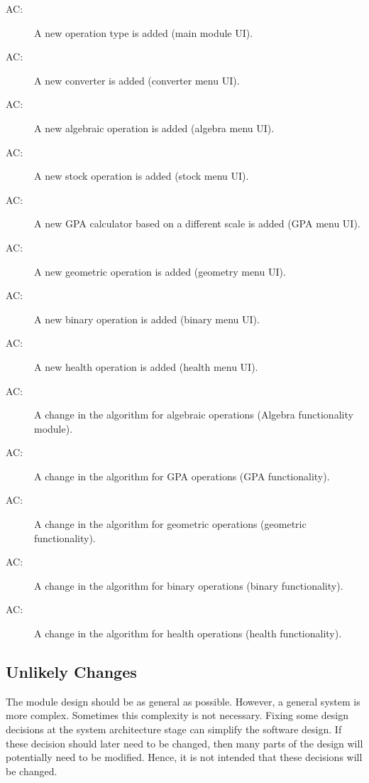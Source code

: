 \documentclass[12pt, titlepage]{article}
\newcounter{acnum}
\newcommand{\actheacnum}{AC\theacnum}
\begin{document}
\begin{description}
\item[ \actheacnum \label{acOp}:] A new operation type is added (main module UI).
\item[ \actheacnum \label{acCon}:] A new converter is added (converter menu UI).
\item[ \actheacnum \label{acAlg}:] A new algebraic operation is added (algebra menu UI).
\item[ \actheacnum \label{acStk}:] A new stock operation is added (stock menu UI).
\item[ \actheacnum \label{acGPA}:] A new GPA calculator based on a different scale is added (GPA menu UI).
\item[ \actheacnum \label{acGeo}:] A new geometric operation is added (geometry menu UI).
\item[ \actheacnum \label{acBin}:] A new binary operation is added (binary menu UI).
\item[ \actheacnum \label{acHlth}:] A new health operation is added (health menu UI).
\item[ \actheacnum \label{acAlg1}:] A change in the algorithm for algebraic operations (Algebra functionality module).
\item[ \actheacnum \label{acAlg2}:] A change in the algorithm for GPA operations (GPA functionality).
\item[ \actheacnum \label{acAlg3}:] A change in the algorithm for geometric operations (geometric functionality).
\item[ \actheacnum \label{acAlg4}:] A change in the algorithm for binary operations (binary functionality).
\item[ \actheacnum \label{acAlg5}:] A change in the algorithm for health operations (health functionality).





\end{description}

\subsection{Unlikely Changes} \label{SecUchange}

The module design should be as general as possible. However, a general system is
more complex. Sometimes this complexity is not necessary. Fixing some design
decisions at the system architecture stage can simplify the software design. If
these decision should later need to be changed, then many parts of the design
will potentially need to be modified. Hence, it is not intended that these
decisions will be changed.
\end{document}
